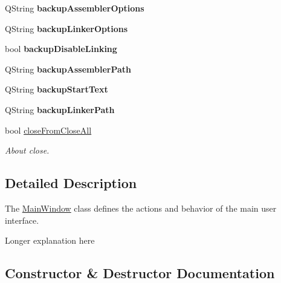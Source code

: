 \begin{DoxyCompactItemize}
\item 
\hypertarget{class_main_window_a1af0453c231c87ff14067103b3121803}{}Q\+String {\bfseries backup\+Assembler\+Options}\label{class_main_window_a1af0453c231c87ff14067103b3121803}

\item 
\hypertarget{class_main_window_a1fe62872a358a8f6f20e96c02a9be62f}{}Q\+String {\bfseries backup\+Linker\+Options}\label{class_main_window_a1fe62872a358a8f6f20e96c02a9be62f}

\item 
\hypertarget{class_main_window_a11c38f51d33a2369f1bd444be72975af}{}bool {\bfseries backup\+Disable\+Linking}\label{class_main_window_a11c38f51d33a2369f1bd444be72975af}

\item 
\hypertarget{class_main_window_a44be17fe698b7a47c0d118379075c8e9}{}Q\+String {\bfseries backup\+Assembler\+Path}\label{class_main_window_a44be17fe698b7a47c0d118379075c8e9}

\item 
\hypertarget{class_main_window_a36891330292ae023d8de31113a555b63}{}Q\+String {\bfseries backup\+Start\+Text}\label{class_main_window_a36891330292ae023d8de31113a555b63}

\item 
\hypertarget{class_main_window_ad28f0fe6e6dc8caf75173b19db1972c4}{}Q\+String {\bfseries backup\+Linker\+Path}\label{class_main_window_ad28f0fe6e6dc8caf75173b19db1972c4}

\item 
\hypertarget{class_main_window_a4b71407a32d640de521b24eed1c8d672}{}bool \hyperlink{class_main_window_a4b71407a32d640de521b24eed1c8d672}{close\+From\+Close\+All}\label{class_main_window_a4b71407a32d640de521b24eed1c8d672}

\begin{DoxyCompactList}\small\item\em About close. \end{DoxyCompactList}\end{DoxyCompactItemize}


\subsection{Detailed Description}
The \hyperlink{class_main_window}{Main\+Window} class defines the actions and behavior of the main user interface. 

Longer explanation here 

\subsection{Constructor \& Destructor Documentation}
\hypertarget{class_main_window_affc2bb4c6ca84428e7121d8aac999164}{}
